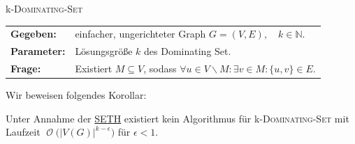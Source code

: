 \documentclass[a4paper,ngerman]{atseminar}
\newcommand{\N}{\ensuremath{\mathbb{N}}\xspace}
\newcommand{\BigO}[1]{\ensuremath{\operatorname{\mathcal{O}}\bigl(#1\bigr)}\xspace}
\begin{document}
\begin{definition}{k-\textsc{Dominating-Set}}
  \\
  \begin{tabular}{ll}
    \textbf{Gegeben:} & einfacher, ungerichteter Graph $G = (V, E), \quad k \in \N$. \\
    \textbf{Parameter:} & Lösungsgröße $k$ des Dominating Set. \\
    \textbf{Frage:} & Existiert $M \subseteq V$, sodass $\forall u \in V \backslash M: \exists v \in M : \{u, v\} \in E$.
  \end{tabular}
\end{definition}

\noindent
Wir beweisen folgendes Korollar:

\begin{corollary}
  Unter Annahme der \hyperref[oe:definition:seth]{SETH} existiert kein Algorithmus für k-\textsc{Dominating-Set}
  mit Laufzeit \BigO{|V(G)|^{k - \epsilon}} für $\epsilon < 1$.
\end{corollary}
\end{document}
